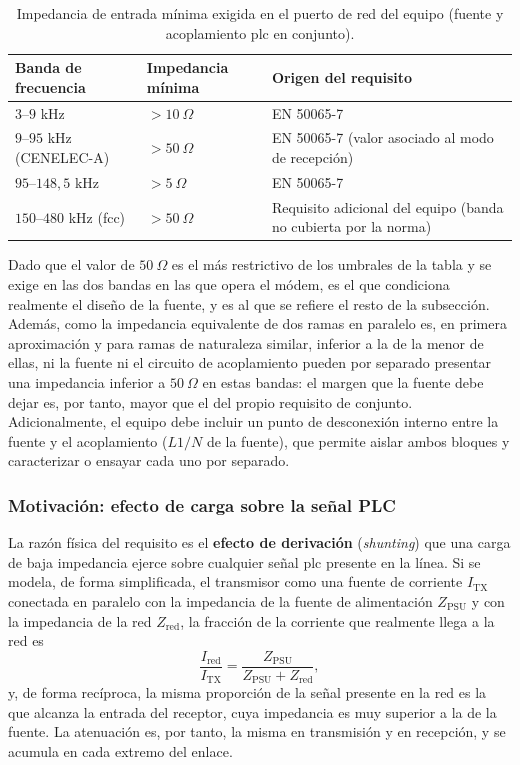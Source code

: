 \begin{table}[!h]
\centering
\small
\begin{tabular}{|p{4.3cm}|p{2.5cm}|p{7.0cm}|}
\hline
\textbf{Banda de frecuencia} & \textbf{Impedancia mínima} & \textbf{Origen del requisito} \\ \hline
$3$--$9$ kHz & $>10\ \Omega$ & EN 50065-7 \\ \hline
$9$--$95$ kHz (CENELEC-A) & $>50\ \Omega$ & EN 50065-7 (valor asociado al modo de recepción) \\ \hline
$95$--$148{,}5$ kHz & $>5\ \Omega$ & EN 50065-7 \\ \hline
$150$--$480$ kHz (\gls{fcc}) & $>50\ \Omega$ & Requisito adicional del equipo (banda no cubierta por la norma) \\ \hline
\end{tabular}
\caption{Impedancia de entrada mínima exigida en el puerto de red del equipo (fuente y acoplamiento \gls{plc} en conjunto).}
\label{tab:requisitos_impedancia_entrada}
\end{table}

Dado que el valor de $50\ \Omega$ es el más restrictivo de los umbrales de la tabla y se exige en las dos bandas en las que opera el módem, es el que condiciona realmente el diseño de la fuente, y es al que se refiere el resto de la subsección. Además, como la impedancia equivalente de dos ramas en paralelo es, en primera aproximación y para ramas de naturaleza similar, inferior a la de la menor de ellas, ni la fuente ni el circuito de acoplamiento pueden por separado presentar una impedancia inferior a $50\ \Omega$ en estas bandas: el margen que la fuente debe dejar es, por tanto, mayor que el del propio requisito de conjunto. Adicionalmente, el equipo debe incluir un punto de desconexión interno entre la fuente y el acoplamiento ($L1/N$ de la fuente), que permite aislar ambos bloques y caracterizar o ensayar cada uno por separado.

\subsubsection*{Motivación: efecto de carga sobre la señal PLC}

La razón física del requisito es el \textbf{efecto de derivación} (\textit{shunting}) que una carga de baja impedancia ejerce sobre cualquier señal \gls{plc} presente en la línea. Si se modela, de forma simplificada, el transmisor como una fuente de corriente $I_{\text{TX}}$ conectada en paralelo con la impedancia de la fuente de alimentación $Z_{\text{PSU}}$ y con la impedancia de la red $Z_{\text{red}}$, la fracción de la corriente que realmente llega a la red es
\begin{equation}
    \frac{I_{\text{red}}}{I_{\text{TX}}} = \frac{Z_{\text{PSU}}}{Z_{\text{PSU}} + Z_{\text{red}}},
    \label{eq:divisor_impedancia_psu}
\end{equation}
y, de forma recíproca, la misma proporción de la señal presente en la red es la que alcanza la entrada del receptor, cuya impedancia es muy superior a la de la fuente. La atenuación es, por tanto, la misma en transmisión y en recepción, y se acumula en cada extremo del enlace.

